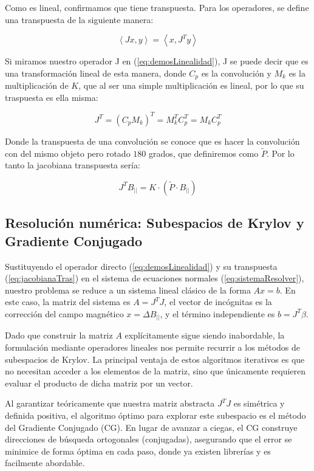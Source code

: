 Como es lineal, confirmamos que tiene transpuesta. Para los operadores, se define una transpuesta de la siguiente manera:

\begin{equation}
    \label{eq:defTraspuesta}
    \left\langle Jx , y \right\rangle = \left\langle x , J^T y \right\rangle
\end{equation}

Si miramos nuestro operador J en (\ref{eq:demosLinealidad}), J se puede decir que es una transformación lineal de esta manera, donde $C_p$ es la convolución y $M_k$ es la multiplicación de $K$, que al ser una simple multiplicación es lineal, por lo que su traspuesta es ella misma:

\begin{equation}
    \label{eq:defTraspuesConjunta}
    J^T = (C_p M_k)^T = M^T_k C_p^T = M_k C_p^T
\end{equation}

Donde la transpuesta de una convolución se conoce que es hacer la convolución con del mismo objeto pero rotado $180$ grados, que definiremos como $\tilde{P}$. Por lo tanto la jacobiana transpuesta sería:

\begin{equation}
    \label{eq:jacobianaTras}
    J^T B_{||} = K \cdot (\tilde{P} \cdot B_{||})
\end{equation}

\subsection{Resolución numérica: Subespacios de Krylov y Gradiente Conjugado}

Sustituyendo el operador directo (\ref{eq:demosLinealidad}) y su transpuesta (\ref{eq:jacobianaTras}) en el sistema de ecuaciones normales (\ref{eq:sistemaResolver}), nuestro problema se reduce a un sistema lineal clásico de la forma $Ax = b$. En este caso, la matriz del sistema es $A = J^T J$, el vector de incógnitas es la corrección del campo magnético $x = \Delta B_{||}$, y el término independiente es $b = J^T \beta$.

Dado que construir la matriz $A$ explícitamente sigue siendo inabordable, la formulación mediante operadores lineales nos permite recurrir a los métodos de subespacios de Krylov. La principal ventaja de estos algoritmos iterativos es que no necesitan acceder a los elementos de la matriz, sino que únicamente requieren evaluar el producto de dicha matriz por un vector. 

Al garantizar teóricamente que nuestra matriz abstracta $J^T J$ es simétrica y definida positiva, el algoritmo óptimo para explorar este subespacio es el método del Gradiente Conjugado (CG). En lugar de avanzar a ciegas, el CG construye direcciones de búsqueda ortogonales (conjugadas), asegurando que el error se minimice de forma óptima en cada paso, donde ya existen librerías y es facilmente abordable.